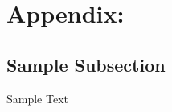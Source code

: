 \section{Appendix:} \label{sec:appendix}

\subsection{Sample Subsection}  \label{ssec:laser_technology}
Sample Text \cite{OurWork}